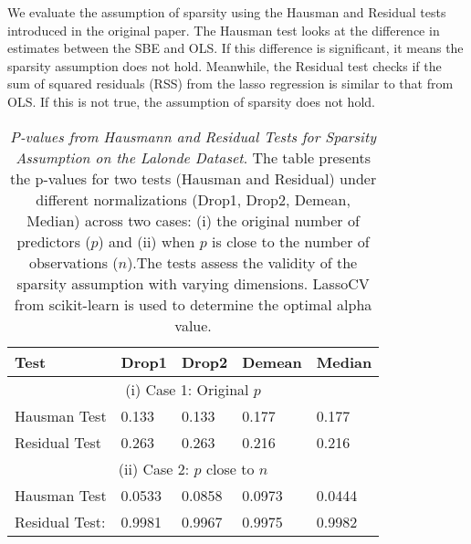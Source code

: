 We evaluate the assumption of sparsity using the Hausman and Residual tests introduced in the original paper. The Hausman test looks at the difference in estimates between the SBE and OLS. If this difference is significant, it means the sparsity assumption does not hold. Meanwhile, the Residual test checks if the sum of squared residuals (RSS) from the lasso regression is similar to that from OLS. If this is not true, the assumption of sparsity does not hold. \\

\begin{table}[h!]
\renewcommand{\arraystretch}{1.5}
\centering
\begin{tabular}{||l l l l l||} 
 \hline
 \hline
 Test & Drop1 & Drop2 &  Demean & Median \\ [0.5ex] 
 \hline \hline
 \multicolumn{5}{||c||}{(i) Case 1: Original $p$} \\ [0.5ex]
 Hausman Test & 0.133 & 0.133 & 0.177 & 0.177 \\ 
 Residual Test & 0.263 & 0.263 & 0.216 & 0.216 \\
 \hline
 \multicolumn{5}{||c||}{(ii) Case 2: $p$ close to $n$} \\ [0.5ex]
 Hausman Test & 0.0533 & 0.0858 & 0.0973 & 0.0444 \\ 
 Residual Test: & 0.9981 & 0.9967  & 0.9975 & 0.9982 \\ [1ex] 
 \hline \hline
\end{tabular}
\caption{\textit{P-values from Hausmann and Residual Tests for Sparsity Assumption on the Lalonde Dataset}. The table presents the p-values for two tests (Hausman and Residual) under different normalizations (Drop1, Drop2, Demean, Median) across two cases: (i) the original number of predictors ($p$) and (ii) when $p$ is close to the number of observations ($n$).The tests assess the validity of the sparsity assumption with varying dimensions. LassoCV from scikit-learn is used to determine the optimal alpha value. }
\label{table:1}
\end{table}

